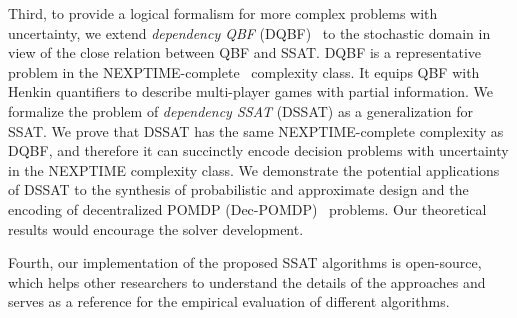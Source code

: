 Third, to provide a logical formalism for more complex problems with uncertainty,
we extend \textit{dependency QBF} (DQBF)~\cite{Balabanov2014,Scholl2018} to the stochastic domain
in view of the close relation between QBF and SSAT.
DQBF is a representative problem in the NEXPTIME-complete~\cite{Peterson2001} complexity class.
It equips QBF with Henkin quantifiers to describe multi-player games with partial information.
We formalize the problem of \textit{dependency SSAT} (DSSAT) as a generalization for SSAT.
We prove that DSSAT has the same NEXPTIME-complete complexity as DQBF,
and therefore it can succinctly encode decision problems with uncertainty in the NEXPTIME complexity class.
We demonstrate the potential applications of DSSAT to the synthesis of probabilistic and approximate design and the encoding of decentralized POMDP (Dec-POMDP)~\cite{Oliehoek2016} problems.
Our theoretical results would encourage the solver development.

Fourth, our implementation of the proposed SSAT algorithms is open-source,
which helps other researchers to understand the details of the approaches and
serves as a reference for the empirical evaluation of different algorithms.

